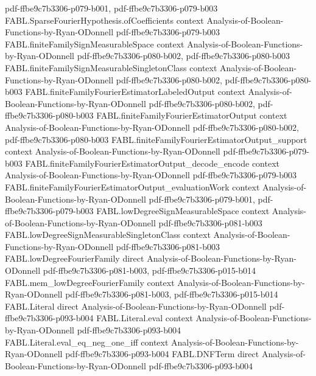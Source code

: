 \begin{theorem}
  {pdf-ffbe9c7b3306-p079-b001,
    pdf-ffbe9c7b3306-p079-b003}
\proofstep
  {FABL.SparseFourierHypothesis.ofCoefficients}
  {context}
  {Analysis-of-Boolean-Functions-by-Ryan-ODonnell}
  {pdf-ffbe9c7b3306-p079-b003}
\proofstep
  {FABL.finiteFamilySignMeasurableSpace}
  {context}
  {Analysis-of-Boolean-Functions-by-Ryan-ODonnell}
  {pdf-ffbe9c7b3306-p080-b002,
    pdf-ffbe9c7b3306-p080-b003}
\proofstep
  {FABL.finiteFamilySignMeasurableSingletonClass}
  {context}
  {Analysis-of-Boolean-Functions-by-Ryan-ODonnell}
  {pdf-ffbe9c7b3306-p080-b002,
    pdf-ffbe9c7b3306-p080-b003}
\proofstep
  {FABL.finiteFamilyFourierEstimatorLabeledOutput}
  {context}
  {Analysis-of-Boolean-Functions-by-Ryan-ODonnell}
  {pdf-ffbe9c7b3306-p080-b002,
    pdf-ffbe9c7b3306-p080-b003}
\proofstep
  {FABL.finiteFamilyFourierEstimatorOutput}
  {context}
  {Analysis-of-Boolean-Functions-by-Ryan-ODonnell}
  {pdf-ffbe9c7b3306-p080-b002,
    pdf-ffbe9c7b3306-p080-b003}
\proofstep
  {FABL.finiteFamilyFourierEstimatorOutput_support}
  {context}
  {Analysis-of-Boolean-Functions-by-Ryan-ODonnell}
  {pdf-ffbe9c7b3306-p079-b003}
\proofstep
  {FABL.finiteFamilyFourierEstimatorOutput_decode_encode}
  {context}
  {Analysis-of-Boolean-Functions-by-Ryan-ODonnell}
  {pdf-ffbe9c7b3306-p079-b003}
\proofstep
  {FABL.finiteFamilyFourierEstimatorOutput_evaluationWork}
  {context}
  {Analysis-of-Boolean-Functions-by-Ryan-ODonnell}
  {pdf-ffbe9c7b3306-p079-b001,
    pdf-ffbe9c7b3306-p079-b003}
\proofstep
  {FABL.lowDegreeSignMeasurableSpace}
  {context}
  {Analysis-of-Boolean-Functions-by-Ryan-ODonnell}
  {pdf-ffbe9c7b3306-p081-b003}
\proofstep
  {FABL.lowDegreeSignMeasurableSingletonClass}
  {context}
  {Analysis-of-Boolean-Functions-by-Ryan-ODonnell}
  {pdf-ffbe9c7b3306-p081-b003}
\proofstep
  {FABL.lowDegreeFourierFamily}
  {direct}
  {Analysis-of-Boolean-Functions-by-Ryan-ODonnell}
  {pdf-ffbe9c7b3306-p081-b003,
    pdf-ffbe9c7b3306-p015-b014}
\proofstep
  {FABL.mem_lowDegreeFourierFamily}
  {context}
  {Analysis-of-Boolean-Functions-by-Ryan-ODonnell}
  {pdf-ffbe9c7b3306-p081-b003,
    pdf-ffbe9c7b3306-p015-b014}
\proofstep
  {FABL.Literal}
  {direct}
  {Analysis-of-Boolean-Functions-by-Ryan-ODonnell}
  {pdf-ffbe9c7b3306-p093-b004}
\proofstep
  {FABL.Literal.eval}
  {context}
  {Analysis-of-Boolean-Functions-by-Ryan-ODonnell}
  {pdf-ffbe9c7b3306-p093-b004}
\proofstep
  {FABL.Literal.eval_eq_neg_one_iff}
  {context}
  {Analysis-of-Boolean-Functions-by-Ryan-ODonnell}
  {pdf-ffbe9c7b3306-p093-b004}
\proofstep
  {FABL.DNFTerm}
  {direct}
  {Analysis-of-Boolean-Functions-by-Ryan-ODonnell}
  {pdf-ffbe9c7b3306-p093-b004}

\end{theorem}
